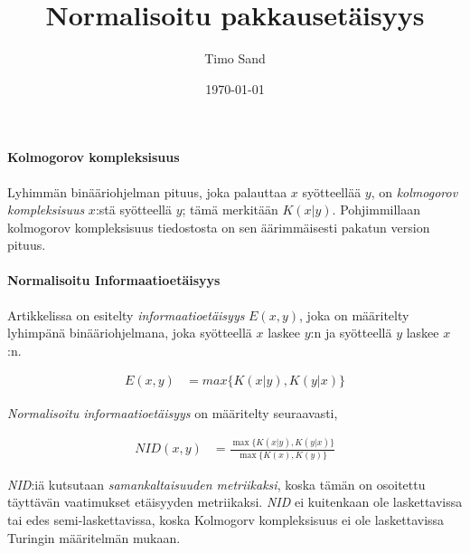 \documentclass[11pt,finnish]{tktltiki2}
\title{Normalisoitu pakkausetäisyys}
\author{Timo Sand}
\date{\today}
\theoremstyle{definition}
\theoremstyle{remark}
\begin{document}

\frontmatter      %

\maketitle        %



\mainmatter       %

\paragraph{Kolmogorov kompleksisuus} %
\label{par:kolmogorov_kompleksisuus}
  Lyhimmän binääriohjelman pituus, joka palauttaa $x$ syötteellää $y$, on \emph{kolmogorov kompleksisuus} $x$:stä syötteellä $y$; tämä merkitään $K(x|y)$. Pohjimmillaan kolmogorov kompleksisuus tiedostosta on sen äärimmäisesti pakatun version pituus.

\paragraph{Normalisoitu Informaatioetäisyys} %
\label{par:normalisoitu_informaatioet_isyys}

  Artikkelissa \cite{CV05} on esitelty \emph{informaatioetäisyys} $E(x,y)$, joka on määritelty lyhimpänä binääriohjelmana, joka syötteellä $x$ laskee $y$:n ja syötteellä $y$ laskee $x$:n.

  \begin{align*}
    E(x,y) &= max\{K(x|y),K(y|x)\}
  \end{align*}

  \emph{Normalisoitu informaatioetäisyys} on määritelty seuraavasti,

  \begin{align*}
    NID(x,y) &= \frac{ \max\{K{(x|y)},K{(y|x)}\} }{ \max \{K(x),K(y)\}}
  \end{align*}

  \emph{NID}:iä kutsutaan \emph{samankaltaisuuden metriikaksi}, koska tämän on osoitettu \cite{CV05} täyttävän vaatimukset etäisyyden metriikaksi. \emph{NID} ei kuitenkaan ole laskettavissa tai edes semi-laskettavissa, koska Kolmogorv kompleksisuus ei ole laskettavissa Turingin määritelmän mukaan.
\end{document}
